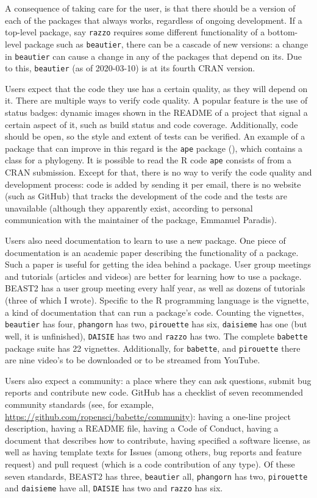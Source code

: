 A consequence of taking care for the user, is that there should be
a version of each of the packages that always works, regardless of ongoing
development. If a top-level package, say \verb;razzo; requires some different 
functionality of a bottom-level package such as \verb;beautier;, there
can be a cascade of new versions: a change in \verb;beautier; 
can cause a change in any of the packages that depend on its.
Due to this, \verb;beautier; (as of 2020-03-10) is at its fourth CRAN version.

Users expect that the code they use has a certain quality,
as they will depend on it. There are multiple ways to verify
code quality. A popular feature is the use of status badges: 
dynamic images shown in the README of a project that 
signal a certain aspect of it, such as build status and code coverage.
Additionally, code should be open, so the style and extent of tests can
be verified. An example of a package that can improve in this
regard is the \verb;ape; package (\cite{ape}), which contains
a class for a phylogeny. It is possible to read the R code \verb;ape; consists
of from a CRAN submission. Except for that, there is no way to 
verify the code quality and development process: code is added by sending 
it per email, there is no website (such as
GitHub) that tracks the development of the code and the tests are 
unavailable (although they apparently exist, according to personal 
communication with the maintainer of the package, Emmanuel Paradis). 

Users also need documentation to learn to use a new package.
One piece of documentation is an academic paper describing the functionality
of a package. Such a paper is useful for getting the idea behind a package.
User group meetings and tutorials (articles and videos) are better for
learning how to use a package. BEAST2 has a user group meeting every half year,
as well as dozens of tutorials (three of which I wrote). Specific to
the R programming language is the vignette, a kind of documentation that
can run a package's code. Counting the vignettes, \verb;beautier; has four, 
\verb;phangorn; has two, \verb;pirouette; has six, \verb;daisieme; has 
one (but well, it is unfinished), \verb;DAISIE; has two and \verb;razzo; has two. 
The complete \verb;babette; package suite has
22 vignettes.
Additionally, for \verb;babette;, and \verb;pirouette; there are nine 
video's to be downloaded or to be streamed from YouTube.

Users also expect a community: a place where they can ask questions,
submit bug reports and contribute new code. GitHub has a checklist of
seven recommended community standards (see, for 
example, \url{https://github.com/ropensci/babette/community}): having 
a one-line project description, 
having a README file, having a Code of Conduct, having a
document that describes how to contribute, having specified a software license, 
as well as having template texts for Issues (among others, bug reports
and feature request) and pull request (which is a code contribution of any type).
Of these seven standards, BEAST2 has three, 
\verb;beautier; all, \verb;phangorn; has two, \verb;pirouette; and \verb;daisieme; have all,
\verb;DAISIE; has two and \verb;razzo; has six.

